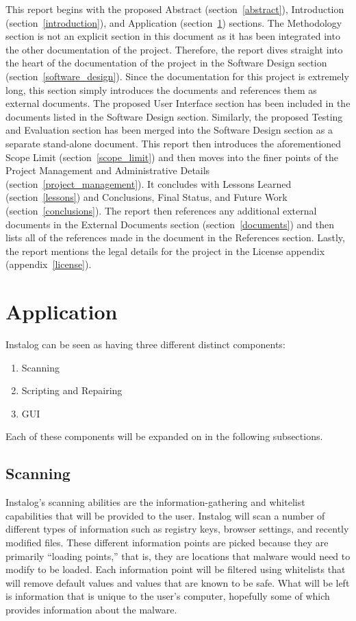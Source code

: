 \documentclass[letterpaper,12pt]{article}
\begin{document}
This report begins with the proposed Abstract (section~\ref{abstract}),
Introduction (section~\ref{introduction}), and Application
(section~\ref{application}) sections.  The Methodology section is not an
explicit section in this document as it has been integrated into the other
documentation of the project.  Therefore, the report dives straight into the
heart of the documentation of the project in the Software Design section
(section~\ref{software_design}).  Since the documentation for this project is
extremely long, this section simply introduces the documents and references them
as external documents.  The proposed User Interface section has been included in
the documents listed in the Software Design section.  Similarly, the proposed
Testing and Evaluation section has been merged into the Software Design section
as a separate stand-alone document. This report then introduces the
aforementioned Scope Limit (section~\ref{scope_limit}) and then moves into the
finer points of the Project Management and Administrative Details
(section~\ref{project_management}).  It concludes with Lessons Learned
(section~\ref{lessons}) and Conclusions, Final Status, and Future Work
(section~\ref{conclusions}). The report then references any additional external
documents in the External Documents section (section~\ref{documents}) and then
lists all of the references made in the document in the References section. 
Lastly, the report mentions the legal details for the project in the License
appendix (appendix~\ref{license}).

\newpage



\section{Application} \label{application}
Instalog can be seen as having three different distinct components:

\begin{enumerate}
  \item Scanning
  \item Scripting and Repairing
  \item GUI
\end{enumerate}

Each of these components will be expanded on in the following subsections.

\subsection{Scanning}
Instalog's scanning abilities are the information-gathering and whitelist
capabilities that will be provided to the user.  Instalog will scan a number of
different types of information such as registry keys, browser settings, and
recently modified files.  These different information points are picked because
they are primarily ``loading points,'' that is, they are locations that malware
would need to modify to be loaded.  Each information point will be filtered
using whitelists that will remove default values and values that are known to be
safe.  What will be left is information that is unique to the user's computer,
hopefully some of which provides information about the malware.
\end{document}
